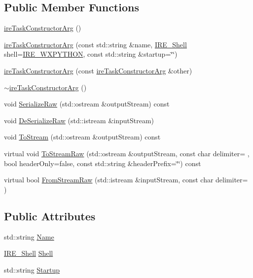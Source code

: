 \subsection*{Public Member Functions}
\begin{DoxyCompactItemize}
\item 
\hyperlink{classire_task_constructor_arg_ab88df56e75650d8ada2319db7351a1da}{ire\+Task\+Constructor\+Arg} ()
\item 
\hyperlink{classire_task_constructor_arg_a2279dd80928d6ef42b481a0ec298373c}{ire\+Task\+Constructor\+Arg} (const std\+::string \&name, \hyperlink{ire_task_8h_acf351b6707399f614eed953a7c0c0d9a}{I\+R\+E\+\_\+\+Shell} shell=\hyperlink{ire_task_8h_acf351b6707399f614eed953a7c0c0d9aa659bffb40eea456bffe6e139d3d15477}{I\+R\+E\+\_\+\+W\+X\+P\+Y\+T\+H\+O\+N}, const std\+::string \&startup=\char`\"{}\char`\"{})
\item 
\hyperlink{classire_task_constructor_arg_a0f935b87bd289a21e47c5437b4bbb818}{ire\+Task\+Constructor\+Arg} (const \hyperlink{classire_task_constructor_arg}{ire\+Task\+Constructor\+Arg} \&other)
\item 
\hyperlink{classire_task_constructor_arg_a1f9fa7a23dde779a9d67f052bd8677ab}{$\sim$ire\+Task\+Constructor\+Arg} ()
\item 
void \hyperlink{classire_task_constructor_arg_a638be7d9bc220b864885f30c4c53aa9d}{Serialize\+Raw} (std\+::ostream \&output\+Stream) const 
\item 
void \hyperlink{classire_task_constructor_arg_ac203b279ff922fb6161399a654402a29}{De\+Serialize\+Raw} (std\+::istream \&input\+Stream)
\item 
void \hyperlink{classire_task_constructor_arg_a53f6578aef2b7665b1e5dee0ee39711c}{To\+Stream} (std\+::ostream \&output\+Stream) const 
\item 
virtual void \hyperlink{classire_task_constructor_arg_a5418e8c1dfd71d99f789b615c9eed5d6}{To\+Stream\+Raw} (std\+::ostream \&output\+Stream, const char delimiter= \textquotesingle{} \textquotesingle{}, bool header\+Only=false, const std\+::string \&header\+Prefix=\char`\"{}\char`\"{}) const 
\item 
virtual bool \hyperlink{classire_task_constructor_arg_a0538948d639995adef2f35d01f1aa93a}{From\+Stream\+Raw} (std\+::istream \&input\+Stream, const char delimiter= \textquotesingle{} \textquotesingle{})
\end{DoxyCompactItemize}
\subsection*{Public Attributes}
\begin{DoxyCompactItemize}
\item 
std\+::string \hyperlink{classire_task_constructor_arg_acdf26b246ab025d372e37d4dd177dc22}{Name}
\item 
\hyperlink{ire_task_8h_acf351b6707399f614eed953a7c0c0d9a}{I\+R\+E\+\_\+\+Shell} \hyperlink{classire_task_constructor_arg_a5235380c8daceb769828415ebdec263e}{Shell}
\item 
std\+::string \hyperlink{classire_task_constructor_arg_ac3551e515c358cec7e4c193d120dbd3f}{Startup}
\end{DoxyCompactItemize}


